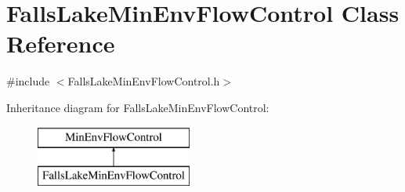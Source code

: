\hypertarget{classFallsLakeMinEnvFlowControl}{}\section{Falls\+Lake\+Min\+Env\+Flow\+Control Class Reference}
\label{classFallsLakeMinEnvFlowControl}


{\ttfamily \#include $<$Falls\+Lake\+Min\+Env\+Flow\+Control.\+h$>$}

Inheritance diagram for Falls\+Lake\+Min\+Env\+Flow\+Control\+:\begin{figure}[H]
\begin{center}
\leavevmode
\includegraphics[height=2.000000cm]{classFallsLakeMinEnvFlowControl}
\end{center}
\end{figure}
